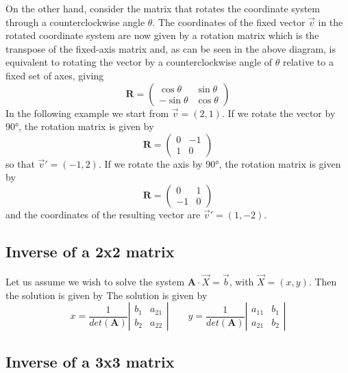 On the other hand, consider the matrix that rotates the coordinate system through 
a counterclockwise angle $\theta$. The coordinates of the fixed vector $\vec{v}$ in the rotated 
coordinate system are now given by a rotation matrix which is the transpose of 
the fixed-axis matrix and, as can be seen in the above diagram, is equivalent to rotating 
the vector by a counterclockwise angle of $\theta$ relative to a fixed set of axes, giving 
\[
{\bm R}=
\left(
\begin{array}{cc}
\cos\theta & \sin \theta \\
-\sin\theta & \cos\theta
\end{array}
\right)
\]
In the following example we start from $\vec{v}=(2,1)$. If we rotate the vector by 90\si{\degree}, 
the rotation matrix is given by 
\[
{\bm R}=
\left(
\begin{array}{cc}
0 & -1 \\ 1 & 0 
\end{array}
\right)
\]
so that $\vec{v}'=(-1,2)$. 
If we rotate the axis by 90\si{\degree}, the 
rotation matrix is given by 
\[
{\bm R}=
\left(
\begin{array}{cc}
0 & 1 \\ -1 & 0 
\end{array}
\right)
\]
and the coordinates of the resulting vector are $\vec{v}'=(1,-2)$.



\subsection{Inverse of a 2x2 matrix \label{sec:inv2x2}}

Let us assume we wish to solve the 
system $\bm A \cdot \vec X = \vec b$, with $\vec X=(x,y)$. Then the solution is given by
The solution is given by
\[
x=\frac{1}{det(\bm A)}
\left|
\begin{array}{cc}
b_1 & a_{21} \\
b_2 & a_{22}
\end{array}
\right|
\qquad
y=\frac{1}{det(\bm A)}
\left|
\begin{array}{cc}
a_{11} & b_1\\
a_{21} & b_2
\end{array}
\right|
\]



\subsection{Inverse of a 3x3 matrix \label{sec:inv3x3}}

